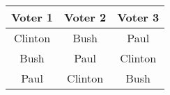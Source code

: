 \documentclass[10pt]{article}
\begin{document}
\sffamily

\begin{tabular}{ccc}
\textbf{Voter 1} & \textbf{Voter 2} & \textbf{Voter 3} \\
\hline
Clinton & Bush    & Paul \\
Bush    & Paul    & Clinton \\
Paul    & Clinton & Bush \\
\hline
\end{tabular}
\end{document}
